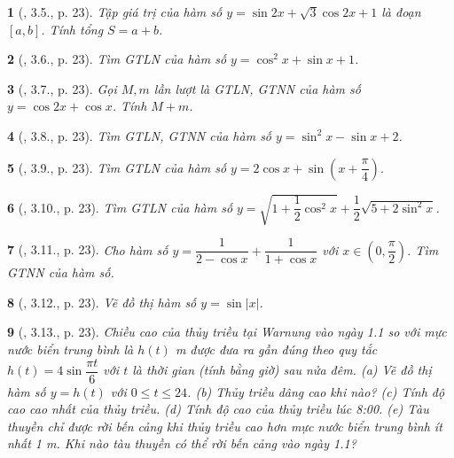 \documentclass{article}
\newtheorem{baitoan}{}
\begin{document}
\begin{baitoan}[\cite{Hung_nang_cao_phat_trien_Toan_11_tap_1}, 3.5., p. 23]
	Tập giá trị của hàm số $y = \sin2x + \sqrt{3}\cos2x + 1$ là đoạn $[a,b]$. Tính tổng $S = a + b$.
\end{baitoan}

\begin{baitoan}[\cite{Hung_nang_cao_phat_trien_Toan_11_tap_1}, 3.6., p. 23]
	Tìm {\rm GTLN} của hàm số $y = \cos^2x + \sin x + 1$.
\end{baitoan}

\begin{baitoan}[\cite{Hung_nang_cao_phat_trien_Toan_11_tap_1}, 3.7., p. 23]
	Gọi $M,m$ lần lượt là {\rm GTLN, GTNN} của hàm số $y = \cos2x + \cos x$. Tính $M + m$.
\end{baitoan}

\begin{baitoan}[\cite{Hung_nang_cao_phat_trien_Toan_11_tap_1}, 3.8., p. 23]
	Tìm {\rm GTLN, GTNN} của hàm số $y = \sin^2x - \sin x + 2$.
\end{baitoan}

\begin{baitoan}[\cite{Hung_nang_cao_phat_trien_Toan_11_tap_1}, 3.9., p. 23]
	Tìm {\rm GTLN} của hàm số $y = 2\cos x + \sin\left(x + \dfrac{\pi}{4}\right)$.
\end{baitoan}

\begin{baitoan}[\cite{Hung_nang_cao_phat_trien_Toan_11_tap_1}, 3.10., p. 23]
	Tìm {\rm GTLN} của hàm số $y = \sqrt{1 + \dfrac{1}{2}\cos^2x} + \dfrac{1}{2}\sqrt{5 + 2\sin^2x}$.
\end{baitoan}

\begin{baitoan}[\cite{Hung_nang_cao_phat_trien_Toan_11_tap_1}, 3.11., p. 23]
	Cho hàm số $y = \dfrac{1}{2 - \cos x} + \dfrac{1}{1 + \cos x}$ với $x\in\left(0,\dfrac{\pi}{2}\right)$. Tìm {\rm GTNN} của hàm số.
\end{baitoan}

\begin{baitoan}[\cite{Hung_nang_cao_phat_trien_Toan_11_tap_1}, 3.12., p. 23]
	Vẽ đồ thị hàm số $y = \sin|x|$.
\end{baitoan}

\begin{baitoan}[\cite{Hung_nang_cao_phat_trien_Toan_11_tap_1}, 3.13., p. 23]
	Chiều cao của thủy triều tại Warnung vào ngày {\rm1.1} so với mực nước biển trung bình là $h(t)$ {\rm m} được đưa ra gần đúng theo quy tắc $h(t) = 4\sin\dfrac{\pi t}{6}$ với $t$ là thời gian (tính bằng giờ) sau nửa đêm. (a) Vẽ đồ thị hàm số $y = h(t)$ với $0\le t\le24$. (b) Thủy triều dâng cao khi nào? (c) Tính độ cao cao nhất của thủy triều. (d) Tính độ cao của thủy triều lúc {\rm8:00}. (e) Tàu thuyền chỉ được rời bến cảng khi thủy triều cao hơn mực nước biển trung bình ít nhất {\rm1 m}. Khi nào tàu thuyền có thể rời bến cảng vào ngày {\rm1.1}?
\end{baitoan}
\end{document}
